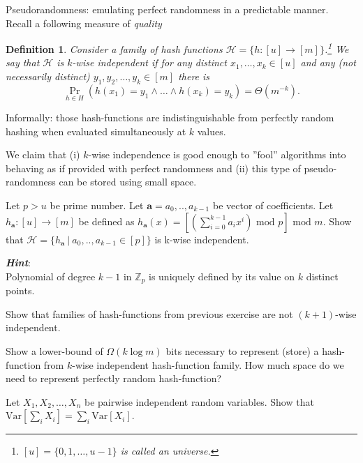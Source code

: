 \documentclass[12pt]{uebung}
\newtheorem{definition}{Definition}
\begin{document}
 


\renewcommand{\aufgname}{Exercise}

Pseudorandomness: emulating perfect randomness in a predictable manner. Recall a following measure of \emph{quality}
\begin{definition}
Consider a family of hash functions $\mathcal{H} = \{h : [u] \to [m]\}$.\footnote{$[u] = \{0,1,\ldots,u-1\}$ is called an \emph{universe}.} We say that $\mathcal{H}$ is $k$-wise independent if for any distinct $x_1,\ldots,x_k \in [u]$ and any (not necessarily distinct) $y_1,y_2,\ldots,y_k \in [m]$ there is
$$\Pr_{h\in H}( h(x_1)=y_1 \wedge \ldots \wedge h(x_k) = y_k ) = \Theta(m^{-k}).$$
\end{definition}
Informally: those hash-functions are indistinguishable from perfectly random hashing when evaluated simultaneously at $k$ values. 

We claim that (i) $k$-wise independence is good enough to ''fool'' algorithms into behaving as if provided with perfect randomness and (ii) this type of pseudo-randomness can be stored using small space.


\begin{aufg}
Let $p > u$ be prime number. 
Let $\mathbf{a} = a_0,..,a_{k-1}$ be vector of coefficients. Let $h_{\mathbf{a}} : [u] \to [m]$ be defined as $h_{\mathbf{a}}(x)=[(\sum_{i=0}^{k-1}a_ix^i) \text{ mod } p ] \text{ mod } m$. Show that $\mathcal{H} = \{h_{\mathbf{a}}\ |\ a_0,..,a_{k-1} \in [p]\}$ is k-wise independent.

\textbf{\em Hint}: \\
Polynomial of degree $k-1$ in $\mathbb{Z}_p$ is uniquely defined by its value on $k$ distinct points.
\end{aufg}

\begin{aufg}
Show that families of hash-functions from previous exercise are not $(k+1)$-wise independent.
\end{aufg}

\begin{aufg}
Show a lower-bound of $\Omega(k \log m)$ bits necessary to represent (store) a hash-function from $k$-wise independent hash-function family. How much space do we need to represent perfectly random hash-function? 
\end{aufg}

\begin{aufg}
Let $X_1,X_2,\ldots,X_n$ be pairwise independent random variables. Show that $\mathrm{Var}[ \sum_i X_i ] = \sum_i \mathrm{Var}[ X_i ]$.
\end{aufg}
\end{document}
